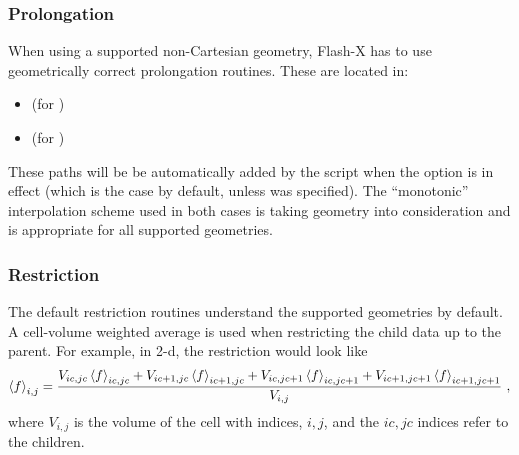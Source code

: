\subsubsection{Prolongation}
When using a supported non-Cartesian geometry, Flash-X has to use
geometrically correct prolongation routines. These
are located in:
\begin{itemize}
\item { (for
)}
\item {
(for )}

\end{itemize}
These paths will be be automatically added by the  script when the
 option is in effect
(which is the case by default, unless  was specified).
The ``monotonic'' interpolation%
scheme
used in both cases is taking geometry
into consideration and is appropriate for all supported geometries.


\subsubsection{Restriction}%
The default restriction routines understand the supported geometries
by default.  A cell-volume weighted average is used when restricting
the child data up to the parent.  For example, in 2-d, the restriction
would look like
\begin{equation}
\left<f\right>_{i,j} = \frac{V_{ic,jc} \left<f\right>_{ic,jc} +
                        V_{ic+1,jc} \left<f\right>_{ic+1,jc} +
                        V_{ic,jc+1} \left<f\right>_{ic,jc+1} +
                        V_{ic+1,jc+1} \left<f\right>_{ic+1,jc+1}}
                       {V_{i,j}}~,
\end{equation}
where $V_{i,j}$ is the volume of the cell with indices, $i, j$, and the
$ic, jc$ indices refer to the children.



